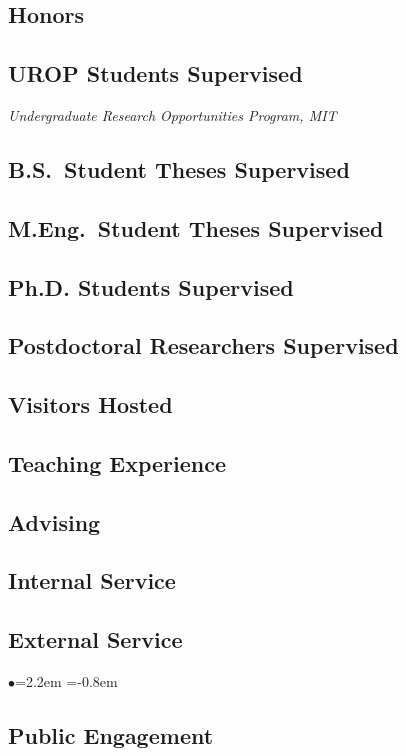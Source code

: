\documentclass[11pt]{article}
\newcommand{\heading}[1]{\vspace{0in}\subsection*{#1} \vspace{.02in}}
\newcommand{\bbl}{\begin{list}{$\bullet$}{\leftmargin=2.2em \itemsep=-1pt \itemindent=-0.8em}}
\newcommand{\el}{\end{list}}
\begin{document}

\heading{Honors}




\heading{UROP Students Supervised}
\vspace{-.1in}
\textit{Undergraduate Research Opportunities Program, MIT}



\heading{B.S.\ Student Theses Supervised}



\heading{M.Eng.\ Student Theses Supervised}



\heading{Ph.D. Students Supervised}



\heading{Postdoctoral Researchers Supervised}



\heading{Visitors Hosted}



\heading{Teaching Experience}



\heading{Advising}



\heading{Internal Service}



\heading{External Service}

\bbl


\el


\heading{Public Engagement}
\end{document}
